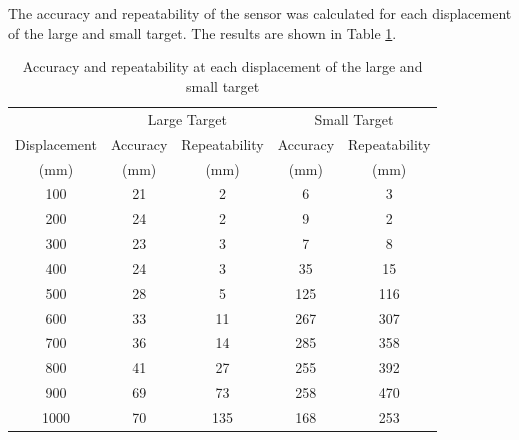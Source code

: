 \section{}

The accuracy and repeatability of the sensor was calculated for each displacement of the large and small target. The results are shown in Table \ref{tab:Q3a}. 


\begin{table}[h]
    \centering
    \caption{Accuracy and repeatability at each displacement of the large and small target}
    \label{tab:Q3a}
    \begin{tabular}{ccccc}
        \hline
        & \multicolumn{2}{c}{Large Target} & \multicolumn{2}{c}{Small Target} \\
        Displacement & Accuracy & Repeatability & Accuracy & Repeatability \\
        (mm) & (mm) & (mm) & (mm) & (mm) \\
        \midrule
        100 & 21 & 2 & 6 & 3 \\
        200 & 24 & 2 & 9 & 2 \\
        300 & 23 & 3 & 7 & 8 \\
        400 & 24 & 3 & 35 & 15 \\
        500 & 28 & 5 & 125 & 116 \\
        600 & 33 & 11 & 267 & 307 \\
        700 & 36 & 14 & 285 & 358 \\
        800 & 41 & 27 & 255 & 392 \\
        900 & 69 & 73 & 258 & 470 \\
        1000 & 70 & 135 & 168 & 253 \\
        \hline
    \end{tabular}
\end{table}

